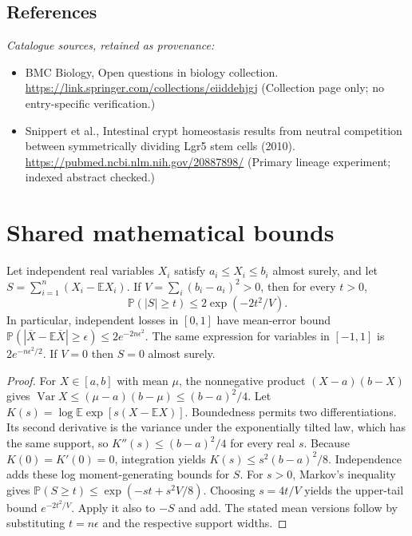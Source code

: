 \documentclass[11pt]{article}
\begin{document}
\subsection{References}
\noindent\emph{Catalogue sources, retained as provenance:}
\begin{itemize}
\item BMC Biology, Open questions in biology collection. \url{https://link.springer.com/collections/eiiddehjgj} (Collection page only; no entry-specific verification.)
\item Snippert et al., Intestinal crypt homeostasis results from neutral competition between symmetrically dividing Lgr5 stem cells (2010). \url{https://pubmed.ncbi.nlm.nih.gov/20887898/} (Primary lineage experiment; indexed abstract checked.)
\end{itemize}




\section{Shared mathematical bounds}\label{app:bounds}
\begin{lemma}\label{lem:bounded}
Let independent real variables $X_i$ satisfy $a_i\leq X_i\leq b_i$ almost surely,
and let $S=\sum_{i=1}^n(X_i-\mathbb{E} X_i)$. If
$V=\sum_i(b_i-a_i)^2>0$, then for every $t>0$,
\[
 \mathbb{P}(|S|\geq t)\leq 2\exp(-2t^2/V).
\]
In particular, independent losses in $[0,1]$ have mean-error bound
$\mathbb{P}(|\overline X-\mathbb{E}\overline X|\geq\epsilon)
\leq2e^{-2n\epsilon^2}$. The same expression for variables in $[-1,1]$
is $2e^{-n\epsilon^2/2}$. If $V=0$ then $S=0$ almost surely.
\end{lemma}
\begin{proof}
For $X\in[a,b]$ with mean $\mu$, the nonnegative product
$(X-a)(b-X)$ gives
$\operatorname{Var} X\leq(\mu-a)(b-\mu)\leq(b-a)^2/4$.
Let $K(s)=\log\mathbb{E}\exp[s(X-\mathbb{E} X)]$.
Boundedness permits two differentiations. Its second derivative is the variance
under the exponentially tilted law, which has the same support, so
$K''(s)\leq(b-a)^2/4$ for every real $s$.
Because $K(0)=K'(0)=0$, integration yields
$K(s)\leq s^2(b-a)^2/8$.
Independence adds these log moment-generating bounds for $S$.
For $s>0$, Markov's inequality gives
$\mathbb{P}(S\geq t)\leq\exp(-st+s^2V/8)$.
Choosing $s=4t/V$ yields the upper-tail bound $e^{-2t^2/V}$.
Apply it also to $-S$ and add. The stated mean versions follow by substituting
$t=n\epsilon$ and the respective support widths.
\end{proof}
\end{document}
